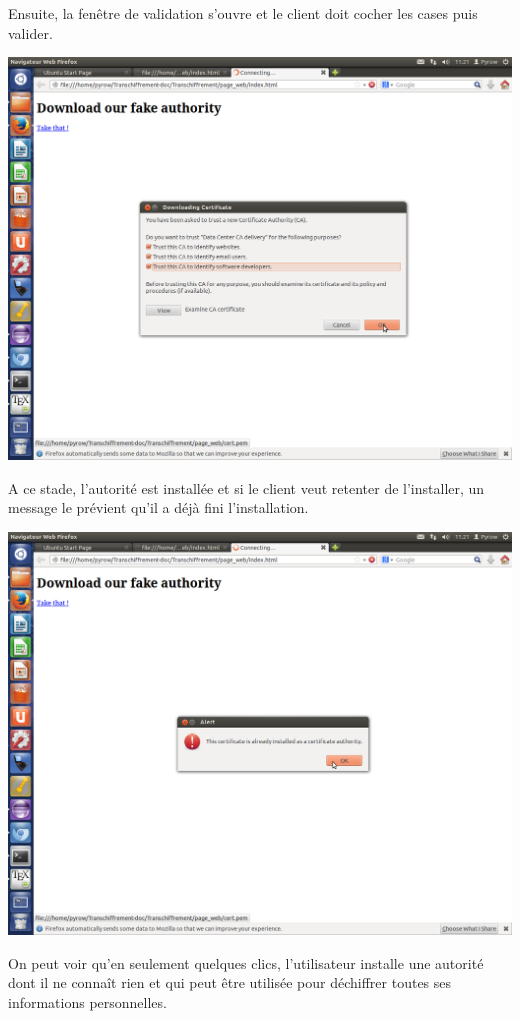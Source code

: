 Ensuite, la fenêtre de validation s'ouvre et le client doit cocher les cases puis valider.

\includegraphics[width=\textwidth]{images_autorites/Cert.png} 
\newpage

A ce stade, l'autorité est installée et si le client veut retenter de l'installer, un message le prévient qu'il a déjà fini l'installation.

\includegraphics[width=\textwidth]{images_autorites/Alerte.png}

On peut voir qu'en seulement quelques clics, l'utilisateur installe une autorité dont il ne connaît rien et qui peut être utilisée pour déchiffrer toutes ses informations personnelles. 
